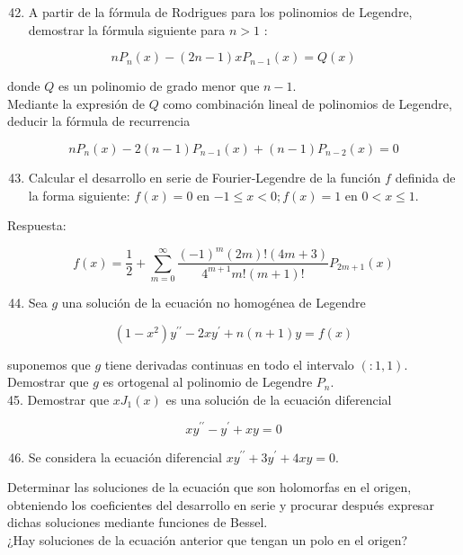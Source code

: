 \documentclass[10pt]{article}
\theoremstyle{plain}
\theoremstyle{definition}
\theoremstyle{remark}
\begin{document}
\begin{enumerate}
  \setcounter{enumi}{41}
  \item A partir de la fórmula de Rodrigues para los polinomios de Legendre, demostrar la fórmula siguiente para $n>1$ :
\end{enumerate}

$$
n P_{n}(x)-(2 n-1) x P_{n-1}(x)=Q(x)
$$

donde $Q$ es un polinomio de grado menor que $n-1$.\\
Mediante la expresión de $Q$ como combinación lineal de polinomios de Legendre, deducir la fórmula de recurrencia

$$
n P_{n}(x)-2(n-1) P_{n-1}(x)+(n-1) P_{n-2}(x)=0
$$

\begin{enumerate}
  \setcounter{enumi}{42}
  \item Calcular el desarrollo en serie de Fourier-Legendre de la función $f$ definida de la forma siguiente: $f(x)=0$ en $-1 \leqslant x<0 ; f(x)=1$ en $0<x \leqslant 1$.
\end{enumerate}

Respuesta:

$$
f(x)=\frac{1}{2}+\sum_{m=0}^{\infty} \frac{(-1)^{m}(2 m)!(4 m+3)}{4^{m+1} m!(m+1)!} P_{2 m+1}(x)
$$

\begin{enumerate}
  \setcounter{enumi}{43}
  \item Sea $g$ una solución de la ecuación no homogénea de Legendre
\end{enumerate}

$$
\left(1-x^{2}\right) y^{\prime \prime}-2 x y^{\prime}+n(n+1) y=f(x)
$$

suponemos que $g$ tiene derivadas continuas en todo el intervalo $(: 1,1)$.\\
Demostrar que $g$ es ortogenal al polinomio de Legendre $P_{n}$.\\
45. Demostrar que $x J_{1}(x)$ es una solución de la ecuación diferencial

$$
x y^{\prime \prime}-y^{\prime}+x y=0
$$

\begin{enumerate}
  \setcounter{enumi}{45}
  \item Se considera la ecuación diferencial $x y^{\prime \prime}+3 y^{\prime}+4 x y=0$.
\end{enumerate}

Determinar las soluciones de la ecuación que son holomorfas en el origen, obteniendo los coeficientes del desarrollo en serie y procurar después expresar dichas soluciones mediante funciones de Bessel.\\
¿Hay soluciones de la ecuación anterior que tengan un polo en el origen?
\end{document}

